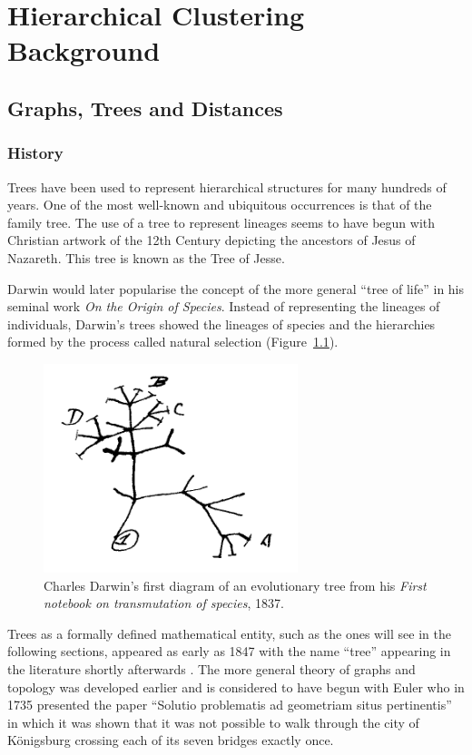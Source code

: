 \chapter{Hierarchical Clustering Background}
\label{cha:background2}



\section{Graphs, Trees and Distances}
\label{sec:graphs-trees-dist}

\subsection{History}
\label{sec:history}

Trees have been used to represent hierarchical structures for many hundreds of
years.  One of the most well-known and ubiquitous occurrences is that of the
family tree.  The use of a tree to represent lineages seems to have begun with
Christian artwork of the 12th Century depicting the ancestors of Jesus of
Nazareth.  This tree is known as the Tree of Jesse.

Darwin would later popularise the concept of the more general ``tree of life''
in his seminal work \textit{On the Origin of Species}.  Instead of
representing the lineages of individuals, Darwin's trees showed the lineages
of species and the hierarchies formed by the process called natural selection
(Figure~\ref{fig:darwin-tree}).

\begin{figure}
  \centering
  \includegraphics[width=20em]{figures/darwin-tree.png}
  \caption{Charles Darwin's first diagram of an evolutionary tree from his
    \textit{First notebook on transmutation of species}, 1837.}
  \label{fig:darwin-tree}
\end{figure}

Trees as a formally defined mathematical entity, such as the ones will see in
the following sections, appeared as early as 1847 with the name ``tree''
appearing in the literature shortly afterwards \cite{knuth97taocp1}.  The more
general theory of graphs and topology was developed earlier and is considered
to have begun with Euler who in 1735 presented the paper ``Solutio problematis
ad geometriam situs pertinentis'' in which it was shown that it was not
possible to walk through the city of Königsburg crossing each of its seven
bridges exactly once.

